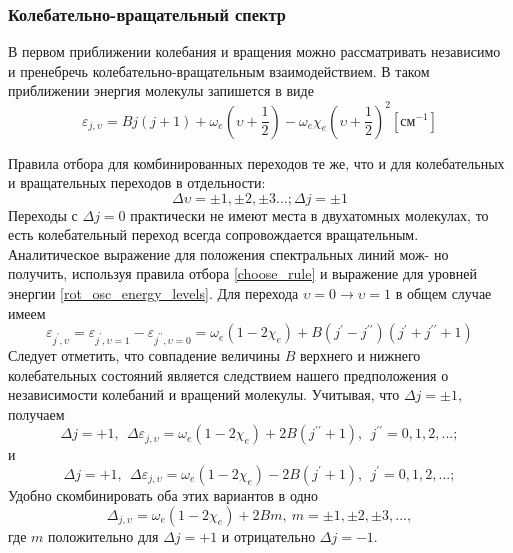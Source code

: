 \subsubsection{Колебательно-вращательный спектр}
В первом приближении колебания и вращения можно рассматривать независимо и пренебречь колебательно-вращательным взаимодействием. В таком приближении энергия молекулы запишется в виде
\begin{equation}
\varepsilon_{j,\upsilon} = Bj(j+1) + \omega_e\left(\upsilon+\frac{1}{2}\right) - \omega_e\chi_e\left(\upsilon+\frac{1}{2}\right)^2 [\textbf{см}^{-1}]
\label{rot_osc_energy_levels}
\end{equation}

Правила отбора для комбинированных переходов те же, что и для
колебательных и вращательных переходов в отдельности:
\begin{equation}
\Delta \upsilon = \pm 1, \pm2, \pm3...; \Delta j = \pm1
\label{choose_rule}
\end{equation}
Переходы с $\Delta j=0$ практически не имеют места в двухатомных молекулах, то есть колебательный переход всегда сопровождается вращательным.
Аналитическое выражение для положения спектральных линий мож-
но получить, используя правила отбора \eqref{choose_rule} и выражение для уровней энергии \eqref{rot_osc_energy_levels}. Для перехода $\upsilon=0\rightarrow\upsilon=1$ в общем случае имеем
\begin{equation}
\varepsilon_{j^\prime, \upsilon} = \varepsilon_{j^\prime, \upsilon=1} - \varepsilon_{j^{\prime\prime}, \upsilon=0} = \omega_e(1-2\chi_e)+B(j^\prime-j^{\prime\prime})(j^\prime+j^{\prime\prime}+1)
\end{equation}
Следует отметить, что совпадение величины $B$ верхнего и нижнего
колебательных состояний является следствием нашего предположения о независимости колебаний и вращений молекулы.
Учитывая, что $\Delta j=\pm1$, получаем
\begin{equation}
\Delta j = +1,\ \ \Delta\varepsilon_{j, \upsilon} =\omega_e(1-2\chi_e)+2B(j^{\prime\prime}+1), \ \ j^{\prime\prime}=0,1,2,...;  
\end{equation}
и
\begin{equation}
\Delta j = +1,\ \ \Delta\varepsilon_{j, \upsilon} =\omega_e(1-2\chi_e)-2B(j^{\prime}+1), \ \ j^{\prime}=0,1,2,...; 
\end{equation}
Удобно скомбинировать оба этих вариантов в одно
\begin{equation}
\Delta_{j,\upsilon} = \omega_e(1-2\chi_e)+2Bm, \ m=\pm 1, \pm 2, \pm 3,...,
\label{perekhod}
\end{equation} где $m$ положительно для $\Delta j =+1$ и отрицательно $\Delta j=-1$.
